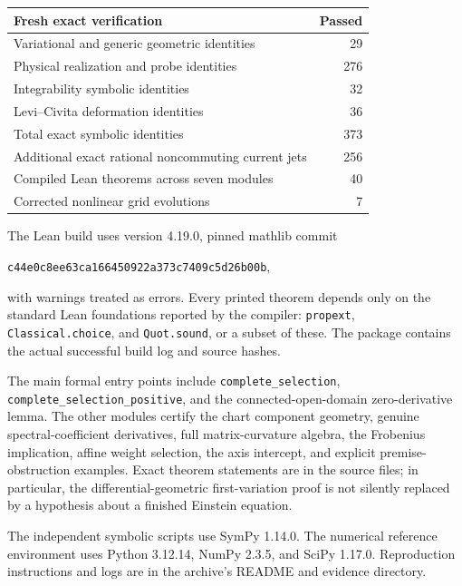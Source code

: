 \begin{center}
\begin{tabular}{@{}p{}r@{}}
\toprule
Fresh exact verification & Passed \\
\midrule
Variational and generic geometric identities & 29 \\
Physical realization and probe identities & 276 \\
Integrability symbolic identities & 32 \\
Levi--Civita deformation identities & 36 \\
\midrule
Total exact symbolic identities & 373 \\
Additional exact rational noncommuting current jets & 256 \\
Compiled Lean theorems across seven modules & 40 \\
Corrected nonlinear grid evolutions & 7 \\
\bottomrule
\end{tabular}
\end{center}

The Lean build uses version 4.19.0, pinned mathlib commit
\begin{center}\texttt{c44e0c8ee63ca166450922a373c7409c5d26b00b},\end{center}
with warnings treated as errors. Every printed theorem depends only on the standard Lean foundations reported by the compiler: \texttt{propext}, \texttt{Classical.choice}, and \texttt{Quot.sound}, or a subset of these. The package contains the actual successful build log and source hashes.

The main formal entry points include \texttt{complete\_selection}, \texttt{complete\_selection\_positive}, and the connected-open-domain zero-derivative lemma. The other modules certify the chart component geometry, genuine spectral-coefficient derivatives, full matrix-curvature algebra, the Frobenius implication, affine weight selection, the axis intercept, and explicit premise-obstruction examples. Exact theorem statements are in the source files; in particular, the differential-geometric first-variation proof is not silently replaced by a hypothesis about a finished Einstein equation.

The independent symbolic scripts use SymPy 1.14.0. The numerical reference environment uses Python 3.12.14, NumPy 2.3.5, and SciPy 1.17.0. Reproduction instructions and logs are in the archive's README and evidence directory.
